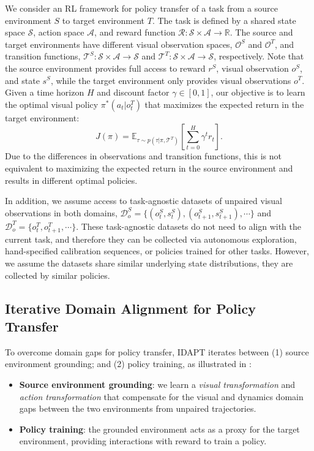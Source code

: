We consider an RL framework for policy transfer of a task from a source environment $S$ to target environment $T$.  The task is defined by a shared state space $\mathcal{S}$, action space $\mathcal{A}$, and reward function $\mathcal{R}: \mathcal{S} \times \mathcal{A} \rightarrow \mathbb{R}$.  The source and target environments have different visual observation spaces, $\mathcal{O}^S$ and $\mathcal{O}^T$, and transition functions, $\mathcal{T}^S: \mathcal{S} \times \mathcal{A} \rightarrow \mathcal{S}$ and $\mathcal{T}^T: \mathcal{S} \times \mathcal{A} \rightarrow \mathcal{S}$, respectively.  Note that the source environment provides full access to reward $r^S$, visual observation $o^S$, and state $s^S$, while the target environment only provides visual observations $o^T$.  Given a time horizon $H$ and discount factor $\gamma \in [0,1]$, our objective is to learn the optimal visual policy $\pi^*(a_t|o^T_t)$ that maximizes the expected return in the target environment:  
\begin{equation}
    \label{eqn:target_J}
    J(\pi) = \mathbb{E}_{\tau \sim p(\tau|\pi,\mathcal{T}^T )} \left [\sum_{t=0}^H \gamma^t r_t \right ].
\end{equation}
Due to the differences in observations and transition functions, this is not equivalent to maximizing the expected return in the source environment and results in different optimal policies.

In addition, we assume access to task-agnostic datasets of unpaired visual observations in both domains, $\mathcal{D}_o^S = \{(o_t^S, s_t^S), (o_{t+1}^S, s_{t+1}^S), \cdots \}$ and $\mathcal{D}_o^T = \{o_t^T, o_{t+1}^T, \cdots \}$. These task-agnostic datasets do not need to align with the current task, and therefore they can be collected via autonomous exploration, hand-specified calibration sequences, or policies trained for other tasks.  However, we assume the datasets share similar underlying state distributions, \ie they are collected by similar policies.



\subsection{Iterative Domain Alignment for Policy Transfer}
\label{sec:iterative_domain_alignment}
To overcome domain gaps for policy transfer, IDAPT iterates between (1) source environment grounding; and (2) policy training, as illustrated in :
\begin{itemize}
    \item \textbf{Source environment grounding}: we learn a \textit{visual transformation} and \textit{action transformation} that compensate for the visual and dynamics domain gaps between the two environments from unpaired trajectories.
    \item \textbf{Policy training}: the grounded environment acts as a proxy for the target environment, providing interactions with reward to train a policy.
\end{itemize}

